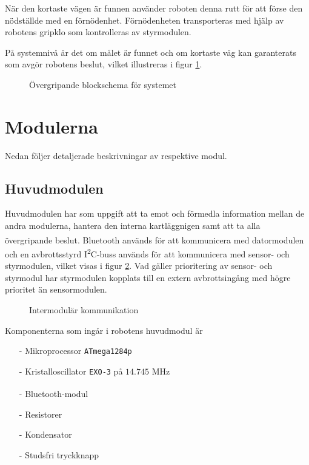 \documentclass[11pt]{article}
\begin{document}
\begin{flushleft}
När den kortaste vägen är funnen använder roboten denna rutt för att förse den nödställde med en förnödenhet. Förnödenheten transporteras med hjälp av robotens gripklo som kontrolleras av styrmodulen.

På systemnivå är det om målet är funnet och om kortaste väg kan garanterats som avgör robotens beslut, vilket illustreras i figur \ref{blockSystem}.

\begin{figure}[htbp]
\centering
\noindent\resizebox{1\linewidth}{!}{
	}
	\caption{Övergripande blockschema för systemet}	\label{blockSystem}
\end{figure}

\pagebreak
\section{Modulerna}
Nedan följer detaljerade beskrivningar av respektive modul.

\subsection{Huvudmodulen}
Huvudmodulen har som uppgift att ta emot och förmedla information mellan de andra modulerna, hantera den interna kartläggnigen samt att ta alla övergripande beslut. Bluetooth\textsuperscript{\circledR} används för att kommunicera med datormodulen och en avbrottsstyrd I\textsuperscript{2}C-buss används för att kommunicera med sensor- och styrmodulen, vilket visas i figur \ref{communication}. Vad gäller prioritering av sensor- och styrmodul har styrmodulen kopplats till en extern avbrottsingång med högre prioritet än sensormodulen.

\begin{figure}[htbp]
\noindent\resizebox{.97\textwidth}{!}{
	}
	\caption{Intermodulär kommunikation \label{communication}}
\end{figure}

Komponenterna som ingår i robotens huvudmodul är 
\begin{itemize}
  \item[-] Mikroprocessor \verb+ATmega1284p+
  \item[-] Kristalloscillator \verb+EXO-3+ på $14.745$ MHz
  \item[-] Bluetooth\textsuperscript{\circledR}-modul
  \item[-] Resistorer
  \item[-] Kondensator
  \item[-] Studsfri tryckknapp
\end{itemize}


\end{flushleft}
\end{document}
